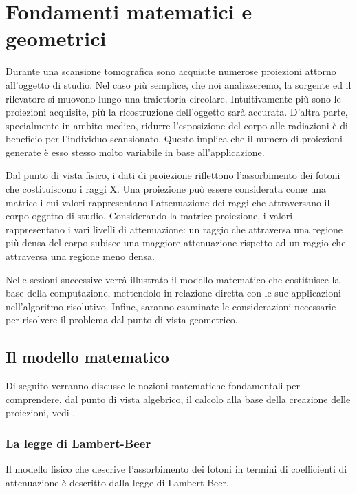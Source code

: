 \documentclass[12pt,a4paper]{report}
\begin{document}
\chapter{Fondamenti matematici e geometrici} \label{chap:math}

Durante una scansione tomografica sono acquisite numerose proiezioni attorno all'oggetto di studio.
Nel caso più semplice, che noi analizzeremo, la sorgente ed il rilevatore si muovono lungo una traiettoria circolare.
Intuitivamente più sono le proiezioni acquisite, più la ricostruzione dell'oggetto sarà accurata.
D'altra parte, specialmente in ambito medico, ridurre l'esposizione del corpo alle radiazioni è di beneficio per l'individuo
scansionato.
Questo implica che il numero di proiezioni generate è esso stesso molto variabile in base all'applicazione.

Dal punto di vista fisico, i dati di proiezione riflettono l'assorbimento dei fotoni che costituiscono i raggi X.
Una proiezione può essere considerata come una matrice i cui valori rappresentano l'attenuazione dei raggi che attraversano il
corpo oggetto di studio.
Considerando la matrice proiezione, i valori rappresentano i vari livelli di attenuazione: un raggio che attraversa una regione
più densa del corpo subisce una maggiore attenuazione rispetto ad un raggio che attraversa una regione meno densa.

Nelle sezioni successive verrà illustrato il modello matematico che costituisce la base della computazione, mettendolo in
relazione diretta con le sue applicazioni nell'algoritmo risolutivo.
Infine, saranno esaminate le considerazioni necessarie per risolvere il problema dal punto di vista geometrico.

\section{Il modello matematico}

Di seguito verranno discusse le nozioni matematiche fondamentali per comprendere, dal punto di vista algebrico, il calcolo
alla base della creazione delle proiezioni, vedi \cite{MoroLoli2021}.

\subsection{La legge di Lambert-Beer}

Il modello fisico che descrive l'assorbimento dei fotoni in termini di coefficienti di attenuazione è descritto dalla legge di
Lambert-Beer.
\end{document}
